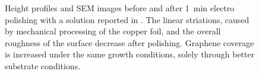 \begin{figure}\centering
	\quad 
	\caption{Height profiles and SEM images before and after \SI{1}{\minute} electro polishing with a solution reported in \cite{bin_zhang_low-temperature_2012}. The linear striations, caused by mechanical processing of the copper foil, and the overall roughness of the surface decrease after polishing. Graphene coverage is increased under the same growth conditions, solely through better substrate conditions.}
	\label{fig:etching-bin-zhang}
\end{figure}

